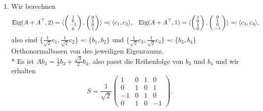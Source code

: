 \begin{enumerate}
	\item Wir berechnen
	\begin{equation*}
		\text{Eig}(A+A^\top,2) = \langle \left( \begin{smallmatrix}
			1 \\ 0 \\ -1 \\ 0
		\end{smallmatrix} \right), \left( \begin{smallmatrix}
			0 \\ 1 \\ 0 \\ 1
		\end{smallmatrix} \right) \rangle \eqqcolon \langle c_1,c_2 \rangle \text{,} \quad \text{Eig}(A+A^\top,1) = \langle \left( \begin{smallmatrix}
			1 \\ 0 \\ 1 \\ 0
		\end{smallmatrix} \right), \left( \begin{smallmatrix}
			0 \\ 1 \\ 0 \\ -1
		\end{smallmatrix} \right) \rangle \eqqcolon \langle c_3,c_4 \rangle \text{,}
	\end{equation*}
	also sind \( \{ \tfrac{1}{\sqrt{2}}c_1 , \tfrac{1}{\sqrt{2}}c_2 \} \eqqcolon \{ b_1,b_2 \} \) und \( \{ \tfrac{1}{\sqrt{2}}c_3, \tfrac{1}{\sqrt{2}}c_4 \} \eqqcolon \{ b_3,b_4 \} \) Orthonormalbasen von des jeweiligen Eigenraums.
	\\*
	Es ist \( Ab_3 = \tfrac{1}{2}b_3 + \tfrac{\sqrt{3}}{2}b_4 \), also passt die Reihenfolge von \( b_3 \) und \( b_4 \) und wir erhalten
	\begin{equation*}
		S = \frac{1}{\sqrt{2}}\begin{pmatrix}
			1 & 0 & 1 & 0 \\
			0 & 1 & 0 & 1 \\
			-1 & 0 & 1 & 0 \\
			0 & 1 & 0 & -1
		\end{pmatrix}\text{.}
	\end{equation*}
\end{enumerate}

\newpage

